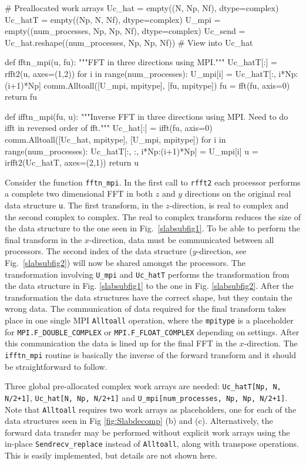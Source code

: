 \documentclass[11pt, oneside]{article}
\newcommand{\inpyth}{\lstinline[style=pythonstyle, basicstyle=\ttfamily]} %[]%
\begin{document}
\begin{python}
# Preallocated work arrays
Uc_hat  = empty((N, Np, Nf), dtype=complex) 
Uc_hatT = empty((Np, N, Nf), dtype=complex) 
U_mpi   = empty((num_processes, Np, Np, Nf), dtype=complex)
Uc_send = Uc_hat.reshape((num_processes, Np, Np, Nf)) # View into Uc_hat

def fftn_mpi(u, fu):
    """FFT in three directions using MPI."""
    Uc_hatT[:] = rfft2(u, axes=(1,2))
    for i in range(num_processes): 
        U_mpi[i] = Uc_hatT[:, i*Np:(i+1)*Np]
    comm.Alltoall([U_mpi, mpitype], [fu, mpitype])    
    fu = fft(fu, axis=0)
    return fu

def ifftn_mpi(fu, u):
    """Inverse FFT in three directions using MPI.
       Need to do ifft in reversed order of fft."""
    Uc_hat[:] = ifft(fu, axis=0)
    comm.Alltoall([Uc_hat, mpitype], [U_mpi, mpitype])
    for i in range(num_processes):
        Uc_hatT[:, :, i*Np:(i+1)*Np] = U_mpi[i]
    u = irfft2(Uc_hatT, axes=(2,1))
    return u
\end{python}
Consider the function \inpyth{fftn_mpi}. In the first call to \inpyth{rfft2} each processor performs a complete two dimensional FFT in both $z$ and $y$ directions on the original real data structure \inpyth{u}. The first transform, in the $z$-direction, is real to complex and the second complex to complex. The real to complex transform reduces the size of the data structure to the one seen in Fig.~\ref{slabsubfig1}. To be able to perform the final transform in the $x$-direction, data must be communicated between all processors. The second index of the data structure ($y$-direction, see Fig.~\ref{slabsubfig2}) will now be shared amongst the processors. The transformation involving \inpyth{U_mpi} and \inpyth{Uc_hatT} performs the transformation from the data structure in Fig. \ref{slabsubfig1} to the one in Fig. \ref{slabsubfig2}. After the transformation the data structures have the correct shape, but they contain the wrong data. The communication of data required for the final transform takes place in one single MPI \inpyth{Alltoall} operation, where the \inpyth{mpitype} is a placeholder for \inpyth{MPI.F_DOUBLE_COMPLEX} or \inpyth{MPI.F_FLOAT_COMPLEX} depending on settings. After this communication the data is lined up for the final FFT in the $x$-direction. The \inpyth{ifftn_mpi} routine is basically the inverse of the forward transform and it should be straightforward to follow.

Three global pre-allocated complex work arrays are needed: \inpyth{Uc_hatT[Np, N, N/2+1]},  \inpyth{Uc_hat[N, Np, N/2+1]} and \inpyth{U_mpi[num_processes, Np, Np, N/2+1]}.
Note that  \inpyth{Alltoall} requires two work arrays as placeholders, one for each of the data structures seen in Fig \ref{fig:Slabdecomp} (b) and (c). Alternatively, the forward data transfer may be performed without explicit work arrays using the in-place \inpyth{Sendrecv_replace} instead of \inpyth{Alltoall}, along with transpose operations. This is easily implemented, but details are not shown here.
\end{document}
